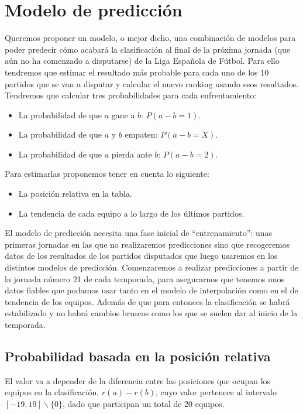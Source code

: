 \chapter{Modelo de predicción}
Queremos proponer un modelo, o mejor dicho, una combinación de modelos para poder predecir cómo acabará la clasificación al final de la próxima jornada (que aún no ha comenzado a disputarse) de la Liga Española de Fútbol. Para ello tendremos que estimar el resultado más probable para cada uno de los 10 partidos que se van a disputar y calcular el nuevo ranking usando esos resultados. Tendremos que calcular tres probabilidades para cada enfrentamiento:
\begin{itemize}
	\item La probabilidad de que $a$ gane a $b$: $P(a-b=1)$.
	\item La probabilidad de que $a$ y $b$ empaten: $P(a-b=X)$.
	\item La probabilidad de que $a$ pierda ante $b$: $P(a-b=2)$.
\end{itemize}
Para estimarlas proponemos tener en cuenta lo siguiente:
\begin{itemize}
	\item La posición relativa en la tabla.
	\item La tendencia de cada equipo a lo largo de los últimos partidos.
\end{itemize}

El modelo de predicción necesita una fase inicial de ``entrenamiento'': unas primeras jornadas en las que no realizaremos predicciones sino que recogeremos datos de los resultados de los partidos disputados que luego usaremos en los distintos modelos de predicción. Comenzaremos a realizar predicciones a partir de la jornada número 21 de cada temporada, para asegurarnos que tenemos unos datos fiables que podamos usar tanto en el modelo de interpolación como en el de tendencia de los equipos. Además de que para entonces la clasificación se habrá estabilizado y no habrá cambios bruscos como los que se suelen dar al inicio de la temporada.

\section{Probabilidad basada en la posición relativa}
El valor va a depender de la diferencia entre las posiciones que ocupan los equipos en la clasificación, $r(a)-r(b)$, cuyo valor pertenece al intervalo $[-19,19] \backslash \{0\}$, dado que participan un total de 20 equipos.\\

